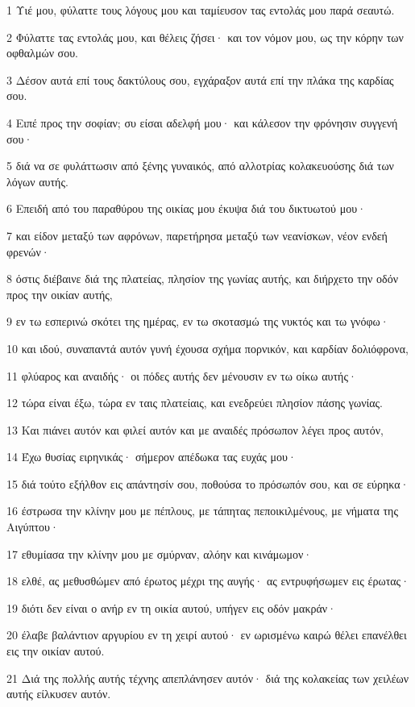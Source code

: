 \par 1 Υιέ μου, φύλαττε τους λόγους μου και ταμίευσον τας εντολάς μου παρά σεαυτώ.
\par 2 Φύλαττε τας εντολάς μου, και θέλεις ζήσει· και τον νόμον μου, ως την κόρην των οφθαλμών σου.
\par 3 Δέσον αυτά επί τους δακτύλους σου, εγχάραξον αυτά επί την πλάκα της καρδίας σου.
\par 4 Ειπέ προς την σοφίαν; συ είσαι αδελφή μου· και κάλεσον την φρόνησιν συγγενή σου·
\par 5 διά να σε φυλάττωσιν από ξένης γυναικός, από αλλοτρίας κολακευούσης διά των λόγων αυτής.
\par 6 Επειδή από του παραθύρου της οικίας μου έκυψα διά του δικτυωτού μου·
\par 7 και είδον μεταξύ των αφρόνων, παρετήρησα μεταξύ των νεανίσκων, νέον ενδεή φρενών·
\par 8 όστις διέβαινε διά της πλατείας, πλησίον της γωνίας αυτής, και διήρχετο την οδόν προς την οικίαν αυτής,
\par 9 εν τω εσπερινώ σκότει της ημέρας, εν τω σκοτασμώ της νυκτός και τω γνόφω·
\par 10 και ιδού, συναπαντά αυτόν γυνή έχουσα σχήμα πορνικόν, και καρδίαν δολιόφρονα,
\par 11 φλύαρος και αναιδής· οι πόδες αυτής δεν μένουσιν εν τω οίκω αυτής·
\par 12 τώρα είναι έξω, τώρα εν ταις πλατείαις, και ενεδρεύει πλησίον πάσης γωνίας.
\par 13 Και πιάνει αυτόν και φιλεί αυτόν και με αναιδές πρόσωπον λέγει προς αυτόν,
\par 14 Έχω θυσίας ειρηνικάς· σήμερον απέδωκα τας ευχάς μου·
\par 15 διά τούτο εξήλθον εις απάντησίν σου, ποθούσα το πρόσωπόν σου, και σε εύρηκα·
\par 16 έστρωσα την κλίνην μου με πέπλους, με τάπητας πεποικιλμένους, με νήματα της Αιγύπτου·
\par 17 εθυμίασα την κλίνην μου με σμύρναν, αλόην και κινάμωμον·
\par 18 ελθέ, ας μεθυσθώμεν από έρωτος μέχρι της αυγής· ας εντρυφήσωμεν εις έρωτας·
\par 19 διότι δεν είναι ο ανήρ εν τη οικία αυτού, υπήγεν εις οδόν μακράν·
\par 20 έλαβε βαλάντιον αργυρίου εν τη χειρί αυτού· εν ωρισμένω καιρώ θέλει επανέλθει εις την οικίαν αυτού.
\par 21 Διά της πολλής αυτής τέχνης απεπλάνησεν αυτόν· διά της κολακείας των χειλέων αυτής είλκυσεν αυτόν.
